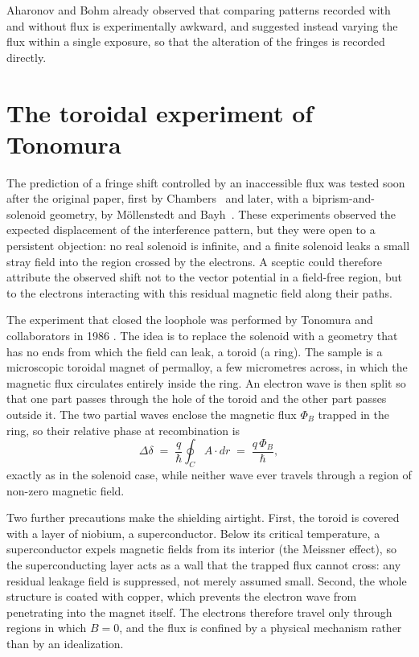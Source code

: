 Aharonov and Bohm already observed that comparing patterns recorded with and without flux is experimentally awkward, and suggested instead varying the flux within a single exposure, so that the alteration of the fringes is recorded directly.

\section{The toroidal experiment of Tonomura}
\label{sec:tonomura}
The prediction of a fringe shift controlled by an inaccessible flux was tested
soon after the original paper, first by
Chambers~\cite{chambersShiftElectronInterference1960} and later, with a
biprism-and-solenoid geometry, by M\"ollenstedt and
Bayh~\cite{mllenstedtMessungKontinuierlichenPhasenschiebung1962}. These experiments
observed the expected displacement of the interference pattern, but they were
open to a persistent objection: no real solenoid is infinite, and a finite
solenoid leaks a small stray field into the region crossed by the electrons.
A sceptic could therefore attribute the observed shift not to the vector
potential in a field-free region, but to the electrons interacting with this
residual magnetic field along their paths.


The experiment that closed the loophole was performed by Tonomura and
collaborators in 1986 \cite{tonomuraEvidenceAharonovBohmEffect1986}. The
idea is to replace the solenoid with a geometry that has no ends from
which the field can leak, a toroid (a ring). The sample is a microscopic
toroidal magnet of permalloy, a few micrometres across, in which the magnetic
flux circulates entirely inside the ring. An electron wave is then split so
that one part passes through the hole of the toroid and
the other part passes outside it. The two partial waves enclose the magnetic
flux \(\Phi_B\) trapped in the ring, so their relative phase at recombination
is
\[
	\Delta \delta \; = \; \frac{q}{\hbar} \oint_C A \cdot dr \; = \;
	\frac{q\, \Phi_B}{\hbar},
\]
exactly as in the solenoid case, while neither wave ever travels through a
region of non-zero magnetic field.

Two further precautions make the shielding airtight. First, the toroid is
covered with a layer of niobium, a superconductor. Below its critical
temperature, a superconductor expels magnetic fields from its interior (the
Meissner effect), so the superconducting layer acts as a wall that the trapped
flux cannot cross: any residual leakage field is suppressed, not merely assumed
small. Second, the whole structure is coated with copper, which prevents the
electron wave from penetrating into the magnet itself. The electrons therefore
travel only through regions in which $B = 0$, and the flux is confined by a
physical mechanism rather than by an idealization.

